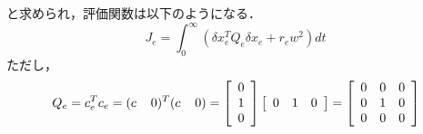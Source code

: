 \documentclass[a4paper,12pt]{jarticle}
\begin{document}
%
と求められ，評価関数は以下のようになる．
%
\begin{equation}
 J_e = \int_0^{\infty} (\delta x_e^T Q_e \delta x_e + r_e w^2) dt
\end{equation}
%
ただし，
%
\begin{equation}
 Q_e = c_e^T c_e = (c \hspace{4mm} 0)^T (c \hspace{4mm} 0) =
 \left[
  \begin{array}{c}
   0 \\
   1 \\
   0 \\
  \end{array}
 \right]
 \left[
  \begin{array}{ccc}
   0 & 1 & 0 \\
  \end{array}
 \right] =
 \left[
  \begin{array}{ccc}
   0 & 0 & 0 \\
   0 & 1 & 0 \\
   0 & 0 & 0 \\
  \end{array}
 \right]
\end{equation}
%
\end{document}
